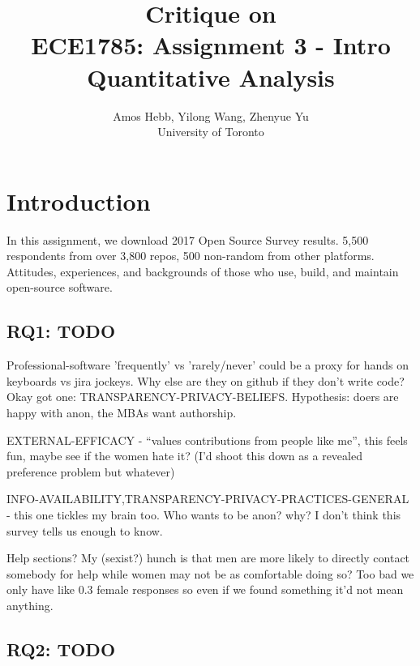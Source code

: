 \documentclass[]{IEEEtran}
\begin{document}
\title{Critique on \\
{\normalsize ECE1785: Assignment 3 - Intro Quantitative Analysis}}

\author{Amos Hebb, Yilong Wang, Zhenyue Yu\\ \small University of Toronto}

\maketitle

\section{Introduction}

In this assignment, we download 2017 Open Source Survey results.
5,500 respondents from over 3,800 repos, 500 non-random from other platforms.
Attitudes, experiences, and backgrounds of those who use, build, and maintain open-source software.

\subsection{RQ1: TODO}

Professional-software 'frequently' vs 'rarely/never' could be a proxy for hands on keyboards vs jira jockeys. Why else are they on github if they don't write code?
Okay got one: TRANSPARENCY-PRIVACY-BELIEFS. Hypothesis: doers are happy with anon, the MBAs want authorship.


EXTERNAL-EFFICACY - ``values contributions from people like me'', this feels fun, maybe see if the women hate it? (I'd shoot this down as a revealed preference problem but whatever)


INFO-AVAILABILITY,TRANSPARENCY-PRIVACY-PRACTICES-GENERAL - this one tickles my brain too. Who wants to be anon? why? I don't think this survey tells us enough to know.


Help sections? My (sexist?) hunch is that men are more likely to directly contact somebody for help while women may not be as comfortable doing so?
Too bad we only have like 0.3 female responses so even if we found something it'd not mean anything.


\subsection{RQ2: TODO}

\end{document}
